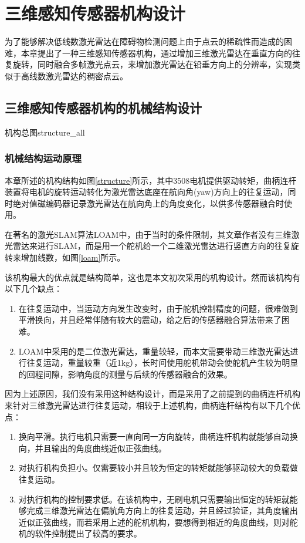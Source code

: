 
\chapter{三维感知传感器机构设计}
为了能够解决低线数激光雷达在障碍物检测问题上由于点云的稀疏性而造成的困难，本章提出了一种三维感知传感器机构，通过增加三维激光雷达在垂直方向的往复旋转，同时融合多帧激光点云，来增加激光雷达在铅垂方向上的分辨率，实现类似于高线数激光雷达的稠密点云。

\section{三维感知传感器机构的机械结构设计}
\begin{pics}[htbp]{机构总图}{structure_all}
\end{pics}
\subsection{机械结构运动原理}
本章所述的机构结构如图\ref{structure}所示，其中3508电机提供驱动转矩，曲柄连杆装置将电机的旋转运动转化为激光雷达底座在航向角(yaw)方向上的往复运动，同时绝对值磁编码器记录激光雷达在航向角上的角度变化，以供多传感器融合时使用。

在著名的激光SLAM算法LOAM中，由于当时的条件限制，其文章作者没有三维激光雷达来进行SLAM，而是用一个舵机给一个二维激光雷达进行竖直方向的往复旋转来增加线数，如图\ref{loam}所示。

该机构最大的优点就是结构简单，这也是本文初次采用的机构设计。然而该机构有以下几个缺点：
\begin{enumerate}
    \item 在往复运动中，当运动方向发生改变时，由于舵机控制精度的问题，很难做到平滑换向，并且经常伴随有较大的震动，给之后的传感器融合算法带来了困难。
    \item LOAM中采用的是二位激光雷达，重量较轻，而本文需要带动三维激光雷达进行往复运动，重量较重（近1kg），长时间使用舵机带动会使舵机产生较为明显的回程间隙，影响角度的测量与后续的传感器融合的效果。
\end{enumerate}

因为上述原因，我们没有采用这种结构设计，而是采用了之前提到的曲柄连杆机构来针对三维激光雷达进行往复运动，相较于上述机构，曲柄连杆结构有以下几个优点：
\begin{enumerate}
    \item 换向平滑。执行电机只需要一直向同一方向旋转，曲柄连杆机构就能够自动换向，并且输出的角度曲线近似正弦曲线。
    \item 对执行机构负担小。仅需要较小并且较为恒定的转矩就能够驱动较大的负载做往复运动。
    \item 对执行机构的控制要求低。在该机构中，无刷电机只需要输出恒定的转矩就能够完成三维激光雷达在偏航角方向上的往复运动，并且经过验证，其角度输出近似正弦曲线，而若采用上述的舵机机构，要想得到相近的角度曲线，则对舵机的软件控制提出了较高的要求。
\end{enumerate}

